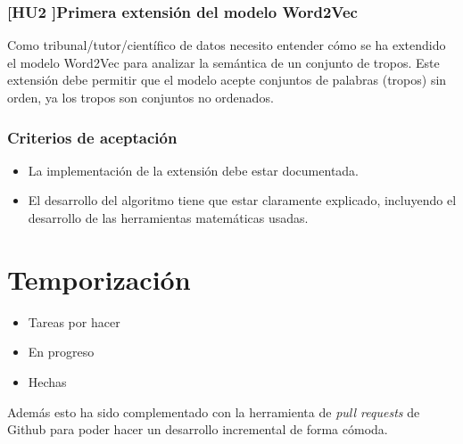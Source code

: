 \subsubsection{[HU2 ]Primera extensión del modelo Word2Vec}\label{uc:word2vec_primera_extension}

Como tribunal/tutor/científico de datos
necesito entender cómo se ha extendido el modelo Word2Vec para analizar la semántica de un conjunto de
tropos. Este extensión debe permitir que el modelo acepte conjuntos de palabras (tropos) sin orden, ya
los tropos son conjuntos no ordenados.

\subsubsection{Criterios de aceptación}

\begin{itemize}
      \item La implementación de la extensión debe estar documentada.
      \item El desarrollo del algoritmo tiene que estar claramente explicado, incluyendo el desarrollo de las herramientas matemáticas usadas.
\end{itemize}

\section{Temporización}
\begin{itemize}
    \item Tareas por hacer
    \item En progreso
    \item Hechas
\end{itemize}

Además esto ha sido complementado con la herramienta de \textit{pull requests} de Github para poder hacer
un desarrollo incremental de forma cómoda.
